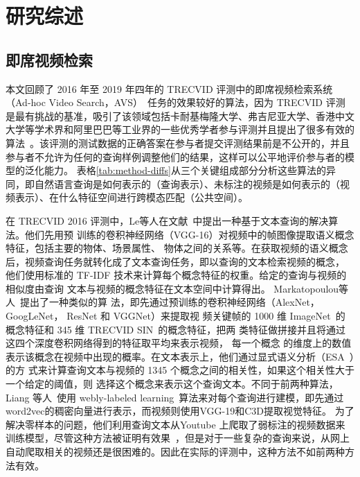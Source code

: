 \chapter{研究综述}

\section{即席视频检索}

本文回顾了 2016 年至 2019 年四年的 TRECVID 评测中的即席视频检索系统（Ad-hoc Video Search，AVS）~\cite{awad2016trecvid,awad2017trecvid,awad2018trecvid,awad2019trecvid}任务的效果较好的算法，因为 TRECVID 评测是最有挑战的基准，吸引了该领域包括卡耐基梅隆大学、弗吉尼亚大学、香港中文大学等学术界和阿里巴巴等工业界的一些优秀学者参与评测并且提出了很多有效的算法~\cite{le2016nii,liang2016inf,foteini2016iti,nguyen2017vireo,snoek2017university,ueki2017waseda,huang2018informedia,bastan2018ntu,li2018renmin,ueki2019waseda,li2019renmin,wu2019hybrid}。该评测的测试数据的正确答案在参与者提交评测结果前是不公开的，并且参与者不允许为任何的查询样例调整他们的结果，这样可以公平地评价参与者的模型的泛化能力。
表格\ref{tab:method-diffs}从三个关键组成部分分析这些算法的异同，即自然语言查询是如何表示的（查询表示）、未标注的视频是如何表示的（视频表示）、在什么特征空间进行跨模态匹配（公共空间）。



在 TRECVID 2016 评测中，Le等人在文献~\cite{le2016nii}中提出一种基于文本查询的解决算法。他们先用预
训练的卷积神经网络（VGG-16）对视频中的帧图像提取语义概念特征，包括主要的物体、场景属性、
物体之间的关系等。在获取视频的语义概念后，视频查询任务就转化成了文本查询任务，即以查询的文本检索视频的概念，
他们使用标准的 TF-IDF 技术来计算每个概念特征的权重。给定的查询与视频的相似度由查询
文本与视频的概念特征在文本空间中计算得出。
Markatopoulou等人~\cite{foteini2016iti}提出了一种类似的算
法，即先通过预训练的卷积神经网络（AlexNet， GoogLeNet， ResNet 和 VGGNet）来提取视
频关键帧的 1000 维 ImageNet~\cite{russakovsky2015imagenet}的概念特征和 345 维 TRECVID SIN~\cite{smeaton2009high}的概念特征，把两
类特征做拼接并且将通过这四个深度卷积网络得到的特征取平均来表示视频， 每一个概念
的维度上的数值表示该概念在视频中出现的概率。在文本表示上，他们通过显式语义分析（ESA~\cite{gabrilovich2007computing}）的方
式来计算查询文本与视频的 1345 个概念之间的相关性，如果这个相关性大于一个给定的阈值，则
选择这个概念来表示这个查询文本。不同于前两种算法，Liang 等人~\cite{liang2016inf}使用 webly-labeled
learning~\cite{liang2016learning}算法来对每个查询进行建模，即先通过word2vec的稠密向量进行表示，而视频则使用VGG-19和C3D提取视觉特征。
为了解决零样本的问题，他们利用查询文本从Youtube 上爬取了弱标注的视频数据来训练模型，尽管这种方法被证明有效果~\cite{kordumova2015best}，但是对于一些复杂的查询来说，从网上自动爬取相关的视频还是很困难的。因此在实际的评测中，这种方法不如前两种方法有效。

